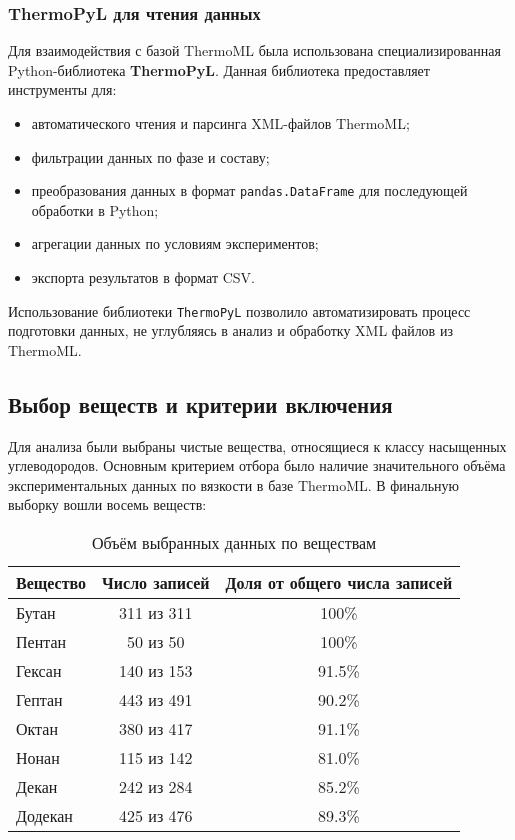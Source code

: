\documentclass[a4paper,12pt]{article}
\begin{document}
    \subsubsection{ThermoPyL для чтения данных}
      Для взаимодействия с базой ThermoML была использована специализированная Python-библиотека \textbf{ThermoPyL}. Данная библиотека предоставляет инструменты для:
      \begin{itemize}
        \item автоматического чтения и парсинга XML-файлов ThermoML;
        \item фильтрации данных по фазе и составу;
        \item преобразования данных в формат \texttt{pandas.DataFrame} для последующей обработки в Python;
        \item агрегации данных по условиям экспериментов;
        \item экспорта результатов в формат CSV.
      \end{itemize}
      
      Использование библиотеки \texttt{ThermoPyL} позволило автоматизировать процесс подготовки данных, не углубляясь в анализ и обработку XML файлов из ThermoML.
    
  \subsection{Выбор веществ и критерии включения}
  
  Для анализа были выбраны чистые вещества, относящиеся к классу насыщенных углеводородов. Основным критерием отбора было наличие значительного объёма экспериментальных данных по вязкости в базе ThermoML. В финальную выборку вошли восемь веществ:
  
  \begin{table}[h!]
  \centering
  \begin{tabular}{|l|c|c|}
  \hline
  \textbf{Вещество} & \textbf{Число записей} & \textbf{Доля от общего числа записей} \\
  \hline
  Бутан     & 311 из 311     & 100\%  \\
  Пентан    & 50 из 50       & 100\%  \\
  Гексан    & 140 из 153     & 91.5\% \\
  Гептан    & 443 из 491     & 90.2\% \\
  Октан     & 380 из 417     & 91.1\% \\
  Нонан     & 115 из 142     & 81.0\% \\
  Декан     & 242 из 284     & 85.2\% \\
  Додекан   & 425 из 476     & 89.3\% \\
  \hline
  \end{tabular}
  \caption{Объём выбранных данных по веществам}
  \end{table}
  
\end{document}
